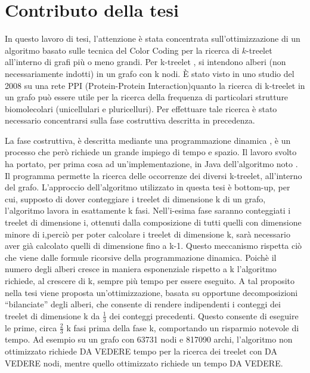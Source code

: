 \section{Contributo della tesi}

In questo lavoro di tesi, l'attenzione \`e stata concentrata  sull'ottimizzazione di un algoritmo basato sulle tecnica del Color Coding per la ricerca di $k$-treelet all'interno di grafi pi\`u o meno grandi.
Per k-treelet , si intendono alberi (non necessariamente indotti) in un grafo con k nodi.
\`E stato visto in uno studio del 2008 \cite{alon2008biomolecular} su una rete PPI (Protein-Protein Interaction)quanto la ricerca di k-treelet in un grafo pu\`o essere utile per la ricerca della frequenza di particolari strutture biomolecolari (unicellulari e pluricelluri).
Per effettuare tale ricerca \`e stato necessario concentrarsi sulla fase costruttiva descritta in precedenza.

La fase costruttiva, \`e descritta mediante una programmazione dinamica , \`e un processo che per\`o richiede un grande impiego di tempo e spazio.
Il lavoro svolto ha portato, per prima cosa ad un'implementazione, in Java dell'algoritmo noto \cite{bressan2018motif}.
Il programma permette la ricerca delle occorrenze dei diversi k-treelet, all'interno del grafo.
L'approccio dell'algoritmo utilizzato in questa tesi \`e bottom-up, per cui, supposto di dover conteggiare i treelet di dimensione k di un grafo, l'algoritmo lavora in esattamente k fasi.
Nell'i-esima fase saranno conteggiati i treelet di dimensione i, ottenuti dalla composizione di tutti quelli con dimensione minore di i,perci\`o per poter calcolare i treelet di dimensione k, sar\`a necessario aver gi\`a calcolato quelli di dimensione fino a k-1.
Questo meccanismo rispetta ci\`o che viene dalle formule ricorsive della programmazione dinamica.
Poich\`e il numero degli alberi cresce in maniera esponenziale rispetto a k l'algoritmo richiede, al crescere di k, sempre pi\`u tempo per essere eseguito.
A tal proposito nella tesi viene proposta un'ottimizzazione, basata su opportune decomposizioni ``bilanciate'' degli alberi, che consente di rendere indipendenti i conteggi dei treelet di dimensione k da $\frac{1}{3}$ dei conteggi precedenti.
Questo consente di eseguire le prime, circa $\frac{2}{3}$ k fasi prima della fase k, comportando un risparmio notevole di tempo.
Ad esempio su un grafo con 63731 nodi e 817090 archi, l'algoritmo non ottimizzato richiede DA VEDERE tempo per la ricerca dei treelet con DA VEDERE nodi, mentre quello ottimizzato richiede un tempo DA VEDERE.



